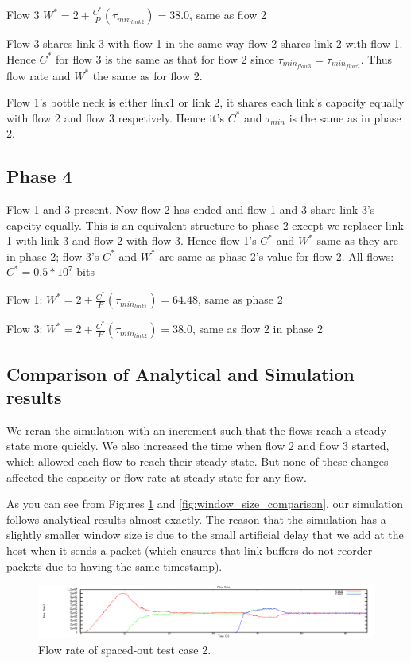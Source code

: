 \documentclass[12pt]{article}
\begin{document}
Flow 3 $W^* = 2+\frac{C^*}{P}(\tau_{min_{link2}}) = 38.0$, same as flow 2

Flow 3 shares link 3 with flow 1 in the same way flow 2 shares link 2 with flow 1. Hence $C^*$ for flow 3 is the same as that for flow 2 since $\tau_{min_{flow3}}=\tau_{min_{flow2}}$. Thus flow rate and $W^*$ the same as for flow 2.

Flow 1's bottle neck is either link1 or link 2, it shares each link's capacity equally with flow 2 and flow 3 respetively. Hence it's $C^*$ and $\tau_{min}$ is the same as in phase 2.


\subsection*{Phase 4}
Flow 1 and 3 present.
Now flow 2 has ended and flow 1 and 3 share link 3's capcity equally. This is an equivalent structure to phase 2 except we replacer link 1 with link 3 and flow 2 with flow 3. Hence flow 1's $C^*$ and $W^*$ same as they are in phase 2; flow 3's $C^*$ and $W^*$ are same as phase 2's value for flow 2.
All flows: $C^* = 0.5*10^7$ bits

Flow 1: $W^* = 2+\frac{C^*}{P}(\tau_{min_{link1}}) = 64.48$, same as phase 2

Flow 3: $W^* = 2+\frac{C^*}{P}(\tau_{min_{link2}}) = 38.0$, same as flow 2 in phase 2


\subsection{Comparison of Analytical and Simulation results}
We reran the simulation with an increment such that the flows reach a steady state more quickly. We also increased the time when flow 2 and flow 3 started, which allowed each flow to reach their steady state. But none of these changes affected the capacity or flow rate at steady state for any flow.

As you can see from Figures \ref{fig:flow_rate_comparison} and \ref{fig:window_size_comparison}, our simulation follows analytical results almost exactly. The reason that the simulation has a slightly smaller window size is due to the small artificial delay that we add at the host when it sends a packet (which ensures that link buffers do not reorder packets due to having the same timestamp).

\begin{figure}[!ht]
\centering \includegraphics[bb= 0 0 1300 250, scale=.35]{figures/flow_rate_comparison.png}
\caption{Flow rate of spaced-out test case 2.}
\label{fig:flow_rate_comparison}
\end{figure}
\end{document}
